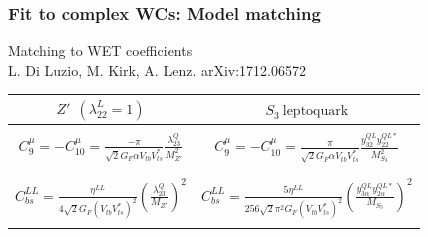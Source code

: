 \documentclass[mathserif, 10pt, dvipsnames]{beamer}
\newcommand\colorcite[1]{{\scriptsize\color{unizarblue}#1}}
\begin{document}
\begin{frame}\frametitle{Fit to complex WCs: Model matching}
Matching to WET coefficients\\ \colorcite{L. Di Luzio, M. Kirk, A. Lenz. arXiv:1712.06572}






\begin{table}
    \centering
    \begin{tabular}{|c|c|}\hline
        {\color{blue}$Z'\ \ (\lambda^L_{22} = 1)$}                 & {\color{red}$S_3\ \text{leptoquark}$} \\\hline
                                                                   &                                       \\
        {\small $C_9^\mu = - C_{10}^\mu = \frac{-\pi}{\sqrt{2} G_F \alpha
        V_{tb} V_{ts}^*}\frac{\lambda^Q_{23}}{M_{Z'}^2}$}          &
        {\small $C_9^\mu = -C_{10}^\mu = \frac{\pi}{\sqrt{2} G_F \alpha V_{tb}
        V_{ts}^*} \frac{y^{QL}_{32} y^{QL*}_{22}}{M^2_{S_3}}$}                                             \\
                                                                   &                                       \\\hline
                                                                   &                                       \\
        {\small $C_{bs}^{LL} = \frac{\eta^{LL}}{4\sqrt{2}G_F (V_{tb}
        V_{ts}^*)^2}\left(\frac{\lambda_{23}^Q}{M_{Z'}}\right)^2$} &
        {\small $C_{bs}^{LL} = \frac{5\eta^{LL}}{256 \sqrt{2} \pi^2 G_F
                        (V_{tb} V_{ts}^*)^2}\left(\frac{y^{QL}_{3\alpha}
                        y^{QL*}_{2\alpha}}{M_{S_3}}\right)^2$}
        \\
                                                                   &                                       \\\hline
    \end{tabular}
\end{table}


\end{frame}
\end{document}
